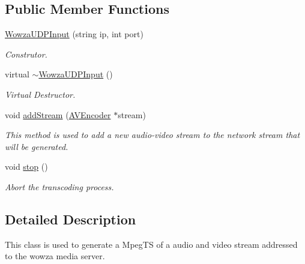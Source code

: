 \subsection*{Public Member Functions}
\begin{DoxyCompactItemize}
\item 
\hyperlink{classbr_1_1ufscar_1_1lince_1_1streaming_1_1WowzaUDPInput_a3cd953cb0be364b786b15745e69f6bd6}{WowzaUDPInput} (string ip, int port)
\begin{DoxyCompactList}\small\item\em Construtor. \item\end{DoxyCompactList}\item 
virtual \hyperlink{classbr_1_1ufscar_1_1lince_1_1streaming_1_1WowzaUDPInput_aa8aa52ebcc298f8e7e60df193cc0fefc}{$\sim$WowzaUDPInput} ()
\begin{DoxyCompactList}\small\item\em Virtual Destructor. \item\end{DoxyCompactList}\item 
void \hyperlink{classbr_1_1ufscar_1_1lince_1_1streaming_1_1WowzaUDPInput_a0b9876d39a409092f24b5b291a410b90}{addStream} (\hyperlink{classbr_1_1ufscar_1_1lince_1_1streaming_1_1AVEncoder}{AVEncoder} $\ast$stream)
\begin{DoxyCompactList}\small\item\em This method is used to add a new audio-\/video stream to the network stream that will be generated. \item\end{DoxyCompactList}\item 
void \hyperlink{classbr_1_1ufscar_1_1lince_1_1streaming_1_1WowzaUDPInput_a90d2675c73c201ed7bc54d64e419f5a8}{stop} ()
\begin{DoxyCompactList}\small\item\em Abort the transcoding process. \item\end{DoxyCompactList}\end{DoxyCompactItemize}


\subsection{Detailed Description}
This class is used to generate a MpegTS of a audio and video stream addressed to the wowza media server. 

